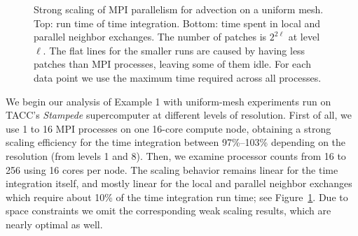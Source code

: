 \documentclass{IOS-Book-Article}     %
\newcommand{\Fig}[1]{Figure~\ref{fig:#1}}
\begin{document}
\begin{figure}
\begin{center}
\end{center}
\caption{Strong scaling of MPI parallelism for advection on a uniform mesh.
  Top: run time of time integration.  Bottom: time spent in local and parallel
  neighbor exchanges.  The number of patches is $2^{2 \ell}$ at level $\ell$.
  The flat lines for the smaller runs are caused by having
  less patches than MPI processes, leaving some of them idle.  For each data point
  we use the maximum time required across all processes.}
\label{fig:uniscale}
\end{figure}%
We begin our analysis of Example 1 with uniform-mesh experiments run on TACC's
\emph{Stampede} supercomputer at different levels of resolution.  First of all,
we use 1 to 16 MPI processes on one 16-core compute node, obtaining a strong
scaling efficiency for the time integration between 97\%--103\% depending on
the resolution (from levels 1 and 8).  Then, we examine processor counts from
16 to 256 using 16 cores per node.  The scaling behavior remains linear for
the time integration itself, and mostly linear for the local and parallel
neighbor exchanges which require about 10\% of the time integration run time;
see \Fig{uniscale}.  Due to space constraints we omit the
corresponding weak scaling results, which are nearly optimal as well.
\end{document}
